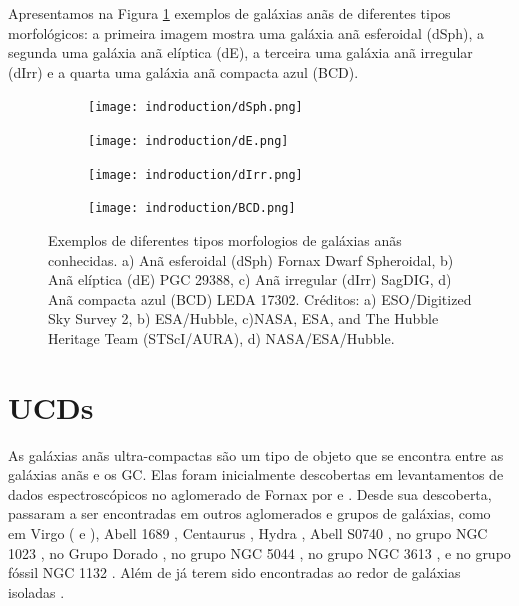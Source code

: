 Apresentamos na Figura \ref{dwarf_galaxies} exemplos de galáxias anãs de diferentes tipos morfológicos: a primeira imagem mostra uma galáxia anã esferoidal (dSph), a segunda uma galáxia anã elíptica (dE), a terceira uma galáxia anã irregular (dIrr) e a quarta uma galáxia anã compacta azul (BCD).


\begin{figure}[!ht]
    \centering
    \captionsetup{justification=centering}
    \begin{subfigure}[b]{0.33\textwidth}
        \texttt{[image: indroduction/dSph.png]}
        \caption{}
    \end{subfigure}
    \begin{subfigure}[b]{0.33\textwidth}
        \texttt{[image: indroduction/dE.png]}
        \caption{}
    \end{subfigure}
    \begin{subfigure}[b]{0.33\textwidth}
        \texttt{[image: indroduction/dIrr.png]}
        \caption{}
    \end{subfigure}
    \begin{subfigure}[b]{0.33\textwidth}
        \texttt{[image: indroduction/BCD.png]}
        \caption{}
    \end{subfigure}
    \caption{Exemplos de diferentes tipos morfologios de galáxias anãs conhecidas. a) Anã esferoidal (dSph) Fornax Dwarf Spheroidal, b) Anã elíptica (dE) PGC 29388, c) Anã irregular (dIrr) SagDIG, d) Anã compacta azul (BCD) LEDA 17302. Créditos: a) ESO/Digitized Sky Survey 2, b) ESA/Hubble, c)NASA, ESA, and The Hubble Heritage Team (STScI/AURA), d) NASA/ESA/Hubble.}
    \label{dwarf_galaxies}
\end{figure}


\section{UCDs}\label{sec:UCDs}
As galáxias anãs ultra-compactas são um tipo de objeto que se encontra entre as galáxias anãs e os \ac{GC}. Elas foram inicialmente descobertas em levantamentos de dados espectroscópicos no aglomerado de Fornax por \citealp{Drinkwater_2000} e \citealp{Hilker_1999}. Desde sua descoberta, passaram a ser encontradas em outros aglomerados e grupos de galáxias, como em Virgo (\citealp{Hasegan_2005} e \citealp{Liu_2020}), Abell 1689 \citep{Mieske_2005}, Centaurus \citep{Mieske_2007}, Hydra \citep{Wehner_Harris_2007}, Abell S0740 \citep{Blakeslee_DeGraaff2008}, no grupo NGC 1023 \citep{Mieske_West_Oliveira_2007}, no Grupo Dorado \citep{Evstigneeva_2007}, no grupo NGC 5044 \citep{Faifer_2017}, no grupo NGC 3613 \citep{Bortoli_2020}, e no grupo fóssil NGC 1132 \citep{Madrid_2011}. Além de já terem sido encontradas ao redor de galáxias isoladas \citep{Hau_2009}.

